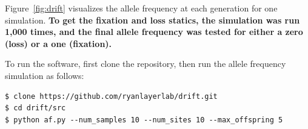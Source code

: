 \documentclass[11pt, letterpaper]{article}
\begin{document}
Figure~\ref{fig:drift} visualizes the allele frequency at each generation for
one simulation.  {\bf To get the fixation and loss statics, the simulation was run
1,000 times, and the final allele frequency was tested for either a zero (loss)
or a one (fixation).}

To run the software, first clone the repository, then run the allele frequency
simulation as follows:
\begin{verbatim}
$ clone https://github.com/ryanlayerlab/drift.git
$ cd drift/src
$ python af.py --num_samples 10 --num_sites 10 --max_offspring 5
\end{verbatim}
\end{document}
